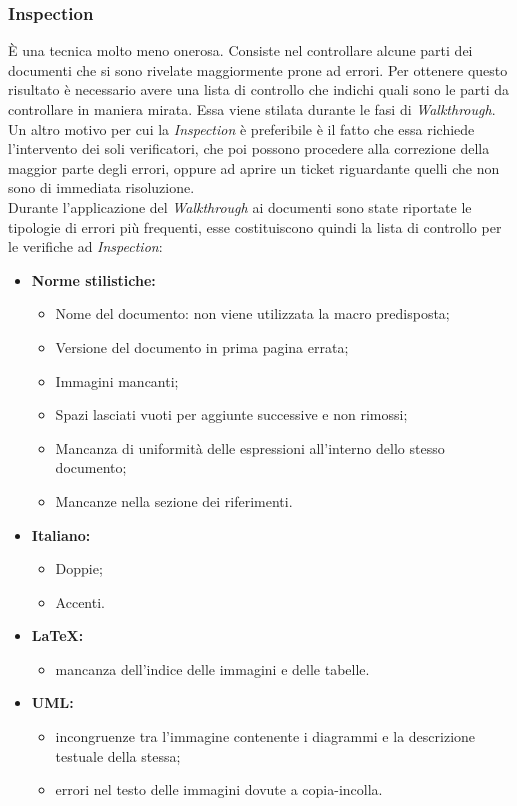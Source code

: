 \documentclass[a4paper]{report}
\begin{document}
				\subsubsection{Inspection}
					È una tecnica molto meno onerosa. Consiste nel controllare alcune parti dei documenti che si sono rivelate 
					maggiormente prone ad errori. Per ottenere questo risultato è necessario avere una lista di controllo che 
					indichi quali sono le parti da controllare in maniera mirata. Essa viene stilata durante le fasi di 
					\emph{Walkthrough}. Un altro motivo per cui la \emph{Inspection} è preferibile è il fatto che essa richiede 
					l'intervento dei soli verificatori, che poi possono procedere alla correzione della maggior parte degli errori, 
					oppure ad aprire un ticket riguardante quelli che non sono di immediata risoluzione.\\
					
					
				Durante l'applicazione del \emph{Walkthrough} ai documenti sono state riportate le tipologie di errori più frequenti, 
				esse costituiscono quindi la lista di controllo per le verifiche ad \emph{Inspection}:
				\begin{itemize}
					\item \textbf{Norme stilistiche:}
					\begin{itemize}
						\item Nome del documento: non viene utilizzata la macro predisposta;
						\item Versione del documento in prima pagina errata;
						\item Immagini mancanti;
						\item Spazi lasciati vuoti per aggiunte successive e non rimossi;
						\item Mancanza di uniformità delle espressioni all'interno dello stesso documento;
						\item Mancanze nella sezione dei riferimenti.
					\end{itemize}
					\item \textbf{Italiano:}
					\begin{itemize}
						\item Doppie;
						\item Accenti.
					\end{itemize}
					\item \textbf{\LaTeX :}
					\begin{itemize}
						\item mancanza dell'indice delle immagini e delle tabelle.
					\end{itemize}
					\item \textbf{UML:}
					\begin{itemize}
						\item incongruenze tra l'immagine contenente i diagrammi e la descrizione testuale della stessa;
						\item errori nel testo delle immagini dovute a copia-incolla.
					\end{itemize}
				\end{itemize}
\end{document}
